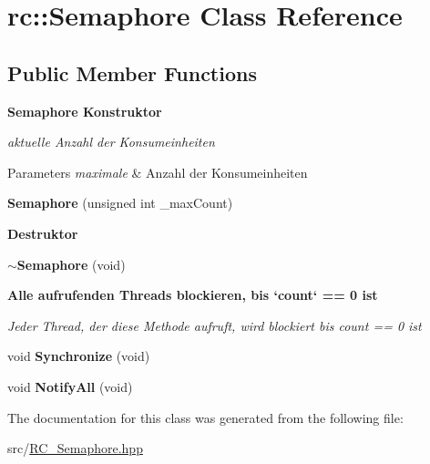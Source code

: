 \hypertarget{classrc_1_1Semaphore}{\section{rc\+:\+:Semaphore Class Reference}
\label{classrc_1_1Semaphore}
}
\subsection*{Public Member Functions}
\begin{Indent}{\bf Semaphore Konstruktor}\par
{\em aktuelle Anzahl der Konsumeinheiten


\begin{DoxyParams}{Parameters}
{\em maximale} & Anzahl der Konsumeinheiten \\
\hline
\end{DoxyParams}
}\begin{DoxyCompactItemize}
\item 
\hypertarget{classrc_1_1Semaphore_a6260f609fc0499bf67a7e5c77198f746}{{\bfseries Semaphore} (unsigned int \+\_\+max\+Count)}\label{classrc_1_1Semaphore_a6260f609fc0499bf67a7e5c77198f746}

\end{DoxyCompactItemize}
\end{Indent}
\begin{Indent}{\bf Destruktor}\par
\begin{DoxyCompactItemize}
\item 
\hypertarget{classrc_1_1Semaphore_ad7bb5c31cb578f9fb68983a23bd6a3e7}{{\bfseries $\sim$\+Semaphore} (void)}\label{classrc_1_1Semaphore_ad7bb5c31cb578f9fb68983a23bd6a3e7}

\end{DoxyCompactItemize}
\end{Indent}
\begin{Indent}{\bf Alle aufrufenden Threads blockieren, bis `count` == 0 ist}\par
{\em Jeder Thread, der diese Methode aufruft, wird blockiert bis {\ttfamily count} == 0 ist }\begin{DoxyCompactItemize}
\item 
\hypertarget{classrc_1_1Semaphore_a0fe2e6a5966af9b2e03dc5f8ffd64aff}{void {\bfseries Synchronize} (void)}\label{classrc_1_1Semaphore_a0fe2e6a5966af9b2e03dc5f8ffd64aff}

\item 
\hypertarget{classrc_1_1Semaphore_a792ef44c87aee407c233e622d5e04cc1}{void {\bfseries Notify\+All} (void)}\label{classrc_1_1Semaphore_a792ef44c87aee407c233e622d5e04cc1}

\end{DoxyCompactItemize}
\end{Indent}


The documentation for this class was generated from the following file\+:\begin{DoxyCompactItemize}
\item 
src/\hyperlink{RC__Semaphore_8hpp}{R\+C\+\_\+\+Semaphore.\+hpp}\end{DoxyCompactItemize}
